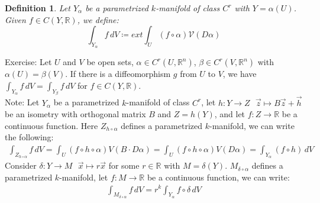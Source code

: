 \documentclass[15pt]{book}
\theoremstyle{break}
\theoremstyle{break}
\newtheorem{defn}{Definition}[corL]
\newcommand{\R}{\mathbb{R}}
\newcommand{\note}{\color{red}Note: \color{black}}
\newcommand{\exercise}{\color{green}Exercise: \color{black}}
\begin{document}
\hfill\break
\begin{defn}
Let $Y_\alpha$ be a parametrized $k$-manifold of class $C^r$ with $Y = \alpha(U)$. \\
Given $f \in C(Y,\R)$, we define: $$\int_{Y_\alpha} f\, dV \coloneqq ext \int_U (f\circ \alpha) \mathcal{V}(D\alpha)$$
\end{defn}
\hfill\break
\exercise Let $U$ and $V$ be open sets, $\alpha \in C^r(U,\R^n)$, $\beta\in C^r(V,\R^n)$ with $\alpha(U) = \beta(V)$. If there is a diffeomorphism $g$ from $U$ to $V$, we have $\int_{Y_\alpha} f\, dV = \int_{Y_\beta} f \, dV$ for $f \in C(Y,\R)$. \\

\note Let $Y_\alpha$ be a parametrized $k$-manifold of class $C^r$, let $h:Y \to Z \ \ \ \vec{z}\mapsto B\vec{z}+\vec{h}$ be an isometry with orthogonal matrix $B$ and $Z = h(Y)$, and let $f:Z \to \R$ be a continuous function. Here $Z_{h\circ \alpha}$ defines a parametrized $k$-manifold, we can write the following:
\begin{align*}
\int_{Z_{h\circ \alpha}}f\, dV = \int_U (f\circ h \circ \alpha) V(B \cdot D\alpha) = \int_U(f\circ h\circ \alpha) V(D\alpha) = \int_{Y_\alpha} (f\circ h) \, dV
\end{align*}
Consider $\delta:Y \to M \ \ \ \vec{x}\mapsto r\vec{x}$ for some $r \in \R$ with $M = \delta(Y)$. $M_{\delta \circ \alpha}$ defines a parametrized $k$-manifold, let $f:M \to \R$ be a continuous function, we can write:
\begin{align*}
\int_{M_{\delta\circ \alpha}}f\, dV =r^k \int_{Y_\alpha} f\circ \delta\, dV
\end{align*}
\end{document}
